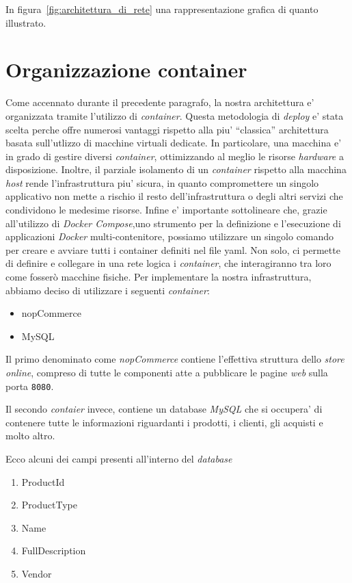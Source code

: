 \documentclass[a4paper]{report}
\newcommand{\quotes}[1]{``#1''}
\begin{document}
		In figura~\ref{fig:architettura_di_rete} una rappresentazione grafica di quanto illustrato.

	\section{Organizzazione container}\label{organizzazione_container}
		Come accennato durante il precedente paragrafo, la nostra architettura e' organizzata tramite l'utilizzo di
		\emph{container}. Questa metodologia di  \emph{deploy} e' stata scelta perche offre numerosi vantaggi rispetto
		alla piu' \quotes{classica} architettura basata sull'utlizzo di macchine virtuali dedicate. In particolare, una
		macchina e' in grado di gestire diversi \emph{container}, ottimizzando al meglio le risorse
		\emph{hardware} a disposizione. Inoltre, il parziale isolamento di un \emph{container} rispetto alla macchina
		\emph{host} rende l'infrastruttura piu' sicura, in quanto compromettere un singolo applicativo non mette a
		rischio il resto dell'infrastruttura o degli altri servizi che condividono le medesime risorse.
		Infine e' importante sottolineare che, grazie all'utilizzo di \emph{Docker Compose},uno strumento per la 
		definizione e l'esecuzione di applicazioni \emph{Docker} multi-contenitore, possiamo utilizzare un singolo comando per
		creare e avviare tutti i container definiti nel file yaml. Non solo, ci permette di definire e collegare in una
		rete logica i \emph{container}, che interagiranno tra loro come fosserò macchine fisiche.
		Per implementare la nostra infrastruttura, abbiamo deciso di utilizzare i seguenti \emph{container}:
		\begin{itemize}
			\item nopCommerce
			\item MySQL
		\end{itemize}
		Il primo denominato come \emph{nopCommerce} contiene l'effettiva struttura dello \emph{store online}, compreso
		di tutte le componenti atte a pubblicare le pagine \emph{web} sulla porta \texttt{8080}.
		
		Il secondo \emph{contaier} invece, contiene un database \emph{MySQL} che si occupera' di contenere tutte le
		informazioni riguardanti i prodotti, i clienti, gli acquisti e molto altro.
		
		Ecco alcuni dei campi presenti all'interno del \emph{database}
		\begin{enumerate}
			\item ProductId
			\item ProductType
			\item Name
			\item FullDescription
			\item Vendor
		\end{enumerate}
\end{document}
